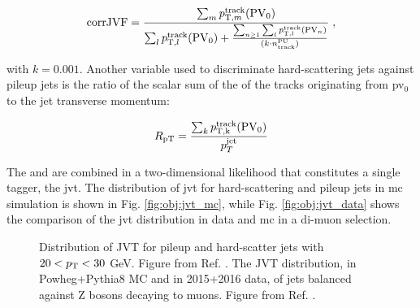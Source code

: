 \begin{equation}
{\rm corrJVF} = \frac{\sum_m{p_{{\rm T}, m}^{{\rm track}}({\rm PV}_0)}}{\sum_l p_{{\rm T}, l}^{{\rm track}}({\rm PV}_0) + \frac{\sum_{n\geq1}\sum_l p_{{\rm T}, l}^{{\rm track}}({\rm PV}_n)}{ (k \cdot n_\mathrm{track}^\mathrm{PU})}} \; ,
\label{eq:corrJVF}
\end{equation}

\noindent with $k=0.001$. Another variable used to discriminate hard-scattering jets against pileup jets is the ratio of the scalar
sum of the \pt of the tracks originating from \gls{pv}$_0$ to the jet transverse momentum:


\begin{equation}
R_\mathrm{pT} = \frac{\sum_k{p_{\rm{T}, k}^{{\rm track}}({\rm PV}_0)}}{p_T^\mathrm{jet}}
\label{eq:obj:rpt}
\end{equation}

The \cJVF and \RpT are combined in a two-dimensional likelihood that constitutes a single tagger, the \gls{jvt}. 
The distribution of \gls{jvt} for hard-scattering and pileup jets in \gls{mc} simulation is shown in Fig. \ref{fig:obj:jvt_mc},
while Fig. \ref{fig:obj:jvt_data} shows the comparison of the \gls{jvt} distribution in data and \gls{mc} in a di-muon selection.


\begin{figure}[h]
\begin{center}
\end{center}
 \caption{ Distribution of JVT for pileup and hard-scatter jets with $20 < p_{\rm T} < 30$ GeV. Figure from Ref. \cite{ATLAS:2014cva}.  The JVT distribution, in Powheg+Pythia8 MC and in 2015+2016 data, of jets balanced against Z bosons decaying to muons. Figure from Ref. \cite{jvtpublicplots}.}
  \label{fig:obj:jvt}
\end{figure}

